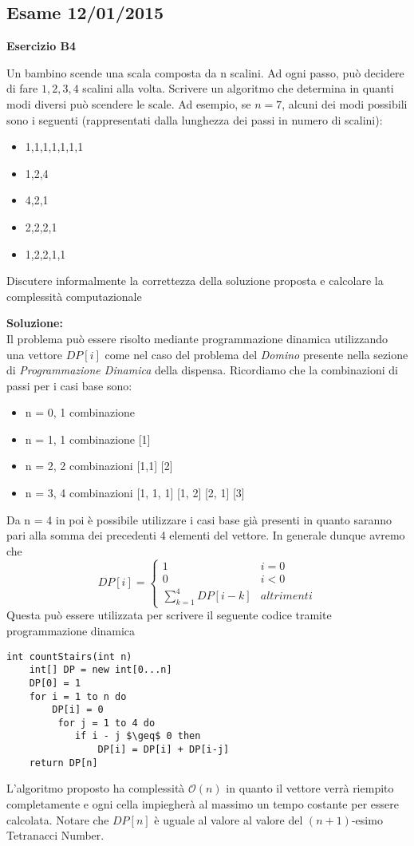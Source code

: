 \documentclass[../cheatSheetAlgoritmi.tex]{subfiles}
\begin{document}
\subsection{Esame 12/01/2015}
\textbf{Esercizio B4}

Un bambino scende una scala composta da n scalini. Ad ogni passo, può decidere di fare $1,2,3,4$ scalini alla volta. Scrivere un algoritmo che determina in quanti modi diversi può scendere le scale. Ad esempio, se $n= 7$, alcuni dei modi possibili sono i seguenti (rappresentati dalla lunghezza dei passi in numero di scalini):
\begin{itemize}
	\item 1,1,1,1,1,1,1
	\item 1,2,4
	\item 4,2,1
	\item 2,2,2,1
	\item 1,2,2,1,1
\end{itemize}
Discutere informalmente la correttezza della soluzione proposta e calcolare la complessità computazionale

\textbf{Soluzione:}\\
Il problema può essere risolto mediante programmazione dinamica utilizzando una vettore $DP[i]$ come nel caso del problema del \emph{Domino} presente nella sezione di \emph{Programmazione Dinamica} della dispensa. Ricordiamo che la combinazioni di passi per i casi base sono:
\begin{itemize}
	\item n = 0, 1 combinazione
	\item n = 1, 1 combinazione 	[1]
	\item n = 2, 2 combinazioni	[1,1] [2]
	\item n = 3, 4 combinazioni	[1, 1, 1] [1, 2] [2, 1] [3]
\end{itemize}
Da n = 4 in poi è possibile utilizzare i casi base già presenti in quanto saranno pari alla somma dei precedenti 4 elementi del vettore. In generale dunque avremo che 
\begin{equation*}
  	DP[i]=\begin{cases}
  		1 & \text{$i = 0$}\\
  		0 & \text{$i < 0$}\\
  		\sum_{k = 1}^{4}{DP[i-k]} & \text{$altrimenti$}
  	\end{cases}
\end{equation*}
Questa può essere utilizzata per scrivere il seguente codice tramite programmazione dinamica
\begin{lstlisting}[caption=modi per scendere le scale]
int countStairs(int n)
	int[] DP = new int[0...n]
	DP[0] = 1
	for i = 1 to n do
		DP[i] = 0
		 for j = 1 to 4 do
		 	if i - j $\geq$ 0 then
		 		DP[i] = DP[i] + DP[i-j]
	return DP[n]
\end{lstlisting}
L'algoritmo proposto ha complessità $\mathcal{O}(n)$ in quanto il vettore verrà riempito completamente e ogni cella impiegherà al massimo un tempo costante per essere calcolata. Notare che $DP[n]$ è uguale al valore al valore del $(n+1)$-esimo Tetranacci Number.
\newpage
\end{document}
